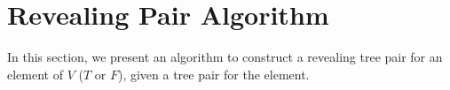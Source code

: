 \documentclass[12pt]{amsart}
\newcommand{\D}{\mathcal{D}}
\newcommand{\R}{\mathcal{R}}
\begin{document}
\begin{comment}
The following lemmas lead to a proof that this algorithm terminates, and that it produces a revealing pair representing the same element $\alpha$ in $V$.

\begin{lemma}
    The number of expansions required to fully resolve a chain is bounded.
\end{lemma}

\begin{proof}[Proof sketch]
    Nate is working on it.
\end{proof}

\begin{lemma}
    During the process of fully resolving a chain, no new \textbf{F} chains are created.
\end{lemma}

\begin{proof}[Proof sketch]
    The only chains affected during a process of fully resolving a chain become part of the \textit{decision tree}. By definition, once this tree is fully resolved, none of the chains are \textbf{F} chains.
\end{proof}

\begin{lemma}
    The number of fully resolving steps is bounded.
\end{lemma}

\begin{proof}[Proof sketch]
    Each time a chain is fully resolved, the number of \textbf{F} chains in the tree is strictly reduced. Since the number of \textbf{F} chains in the original tree is bounded by the size of $L_\D\setminus L_\R$, this process must terminate.
\end{proof}

\begin{theorem}
    The algorithm terminates.
\end{theorem}
\end{comment}

\newpage
\section{Revealing Pair Algorithm}
\label{final-algorithm}

In this section, we present an algorithm to construct a revealing tree pair for an element of $V$ ($T$ or $F$), given a tree pair for the element.
\end{document}
